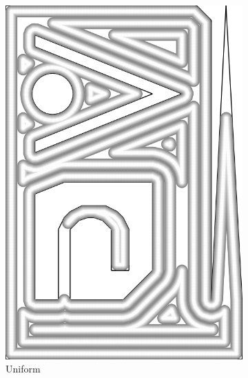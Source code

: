 \begin{figure}
\begin{subfigure}{\figwidth}
\includegraphics[height=\figheight]{sources-validation-gMAT-example-TEST-naive-widths.png}
\caption{Uniform}\label{TEST_naive_accuracy}
\end{subfigure}
\begin{subfigure}{\figwidth}\centering

\end{subfigure}
\end{figure}
